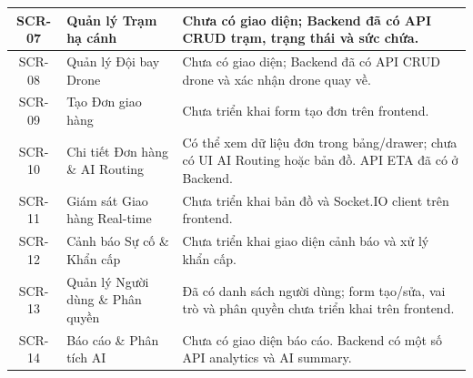 \begin{table}[H]
\begin{tabular}{|c|p{4.2cm}|p{9cm}|}
        SCR-07 &
        Quản lý Trạm hạ cánh &
        Chưa có giao diện; Backend đã có API CRUD trạm, trạng thái và sức chứa. \\
        \hline

        SCR-08 &
        Quản lý Đội bay Drone &
        Chưa có giao diện; Backend đã có API CRUD drone và xác nhận drone quay về. \\
        \hline

        SCR-09 &
        Tạo Đơn giao hàng &
        Chưa triển khai form tạo đơn trên frontend. \\
        \hline

        SCR-10 &
        Chi tiết Đơn hàng \& AI Routing &
        Có thể xem dữ liệu đơn trong bảng/drawer; chưa có UI AI Routing hoặc bản đồ. API ETA đã có ở Backend. \\
        \hline

        SCR-11 &
        Giám sát Giao hàng Real-time &
        Chưa triển khai bản đồ và Socket.IO client trên frontend. \\
        \hline

        SCR-12 &
        Cảnh báo Sự cố \& Khẩn cấp &
        Chưa triển khai giao diện cảnh báo và xử lý khẩn cấp. \\
        \hline

        SCR-13 &
        Quản lý Người dùng \& Phân quyền &
        Đã có danh sách người dùng; form tạo/sửa, vai trò và phân quyền chưa triển khai trên frontend. \\
        \hline

        SCR-14 &
        Báo cáo \& Phân tích AI &
        Chưa có giao diện báo cáo. Backend có một số API analytics và AI summary. \\
        \hline

    \end{tabular}
\end{table}